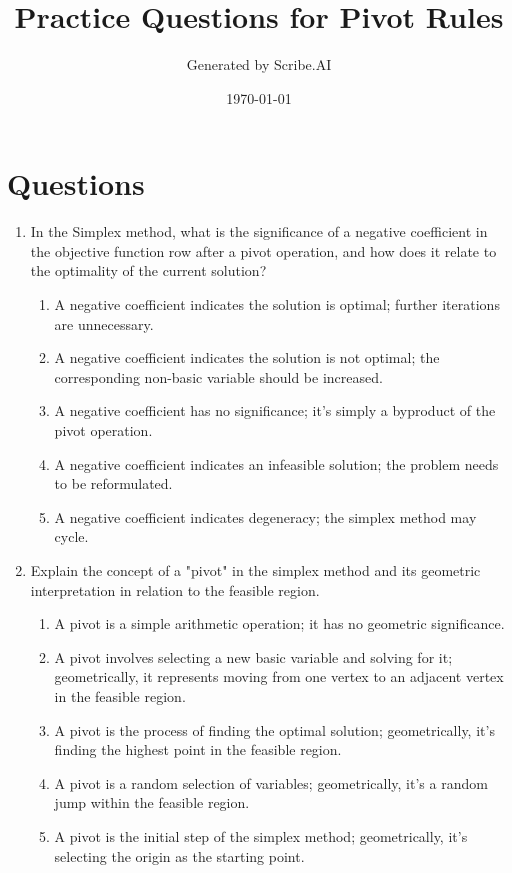 \documentclass{article}%
\title{Practice Questions for Pivot Rules}%
\author{Generated by Scribe.AI}%
\date{\today}%
\begin{document}
%
\normalsize%
\maketitle%
\section{Questions}%
\label{sec:Questions}%
\begin{enumerate}%
\item In the Simplex method, what is the significance of a negative coefficient in the objective function row after a pivot operation, and how does it relate to the optimality of the current solution?%
\begin{enumerate}%
\item A negative coefficient indicates the solution is optimal; further iterations are unnecessary.%
\item A negative coefficient indicates the solution is not optimal; the corresponding non-basic variable should be increased.%
\item A negative coefficient has no significance; it's simply a byproduct of the pivot operation.%
\item A negative coefficient indicates an infeasible solution; the problem needs to be reformulated.%
\item A negative coefficient indicates degeneracy; the simplex method may cycle.%
\end{enumerate}%
\vspace{1em}%
\item Explain the concept of a "pivot" in the simplex method and its geometric interpretation in relation to the feasible region.%
\begin{enumerate}%
\item A pivot is a simple arithmetic operation; it has no geometric significance.%
\item A pivot involves selecting a new basic variable and solving for it; geometrically, it represents moving from one vertex to an adjacent vertex in the feasible region.%
\item A pivot is the process of finding the optimal solution; geometrically, it's finding the highest point in the feasible region.%
\item A pivot is a random selection of variables; geometrically, it's a random jump within the feasible region.%
\item A pivot is the initial step of the simplex method; geometrically, it's selecting the origin as the starting point.%

\end{enumerate}
\end{enumerate}
\end{document}

